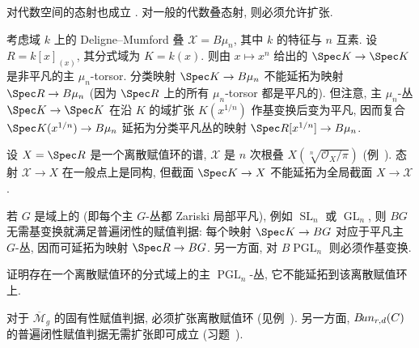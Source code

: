 对代数空间的态射也成立 \cite[Tag 0A40]{SP}. 对一般的代数叠态射, 则必须允许扩张.
\begin{example}\label{src:4.8.17}
考虑域 $k$ 上的 Deligne--Mumford 叠 $\mathcal X=B\mu_n$, 其中 $k$ 的特征与 $n$ 互素. 设 $R=k[x]_{(x)}$, 其分式域为 $K=k(x)$. 则由 $x\mapsto x^n$ 给出的 $\Spec K\to\Spec K$ 是非平凡的主 $\mu_n$-torsor. 分类映射 $\Spec K\to B\mu_n$ 不能延拓为映射 $\Spec R\to B\mu_n$ (因为 $\Spec R$ 上的所有 $\mu_n$-torsor 都是平凡的). 但注意, 主 $\mu_n$-丛 $\Spec K\to\Spec K$ 在沿 $K$ 的域扩张 $K(x^{1/n})$ 作基变换后变为平凡, 因而复合 $\Spec K(x^{1/n})\to B\mu_n$ 延拓为分类平凡丛的映射 $\Spec R[x^{1/n}]\to B\mu_n$.
\end{example}
\begin{example}\label{src:4.8.18}
设 $X=\Spec R$ 是一个离散赋值环的谱, $\mathcal X$ 是 $n$ 次根叠 $X(\sqrt[n]{\mathcal O_X/\pi})$ (例~). 态射 $\mathcal X\to X$ 在一般点上是同构, 但截面 $\Spec K\to\mathcal X$ 不能延拓为全局截面 $X\to\mathcal X$.
\end{example}
若 $G$ 是域上的 (即每个主 $G$-丛都 Zariski 局部平凡), 例如 $\operatorname{SL}_n$ 或 $\operatorname{GL}_n$, 则 $BG$ 无需基变换就满足普遍闭性的赋值判据: 每个映射 $\Spec K\to BG$ 对应于平凡主 $G$-丛, 因而可延拓为映射 $\Spec R\to BG$. 另一方面, 对 $B\operatorname{PGL}_n$ 则必须作基变换.
\begin{exercise}[困难]\label{src:4.8.19}
证明存在一个离散赋值环的分式域上的主 $\operatorname{PGL}_n$-丛, 它不能延拓到该离散赋值环上.
\end{exercise}
对于 $\overline{\mathcal M}_g$ 的固有性赋值判据, 必须扩张离散赋值环 (见例~). 另一方面, $B\!un_{r,d}(C)$ 的普遍闭性赋值判据无需扩张即可成立 (习题~).

